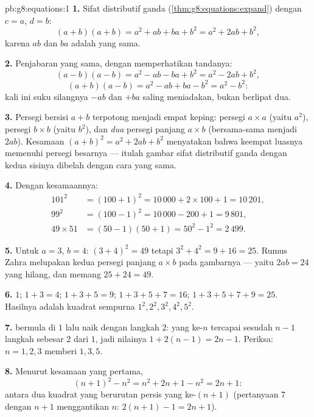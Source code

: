 \begin{solution}{pb:g8:equations:1}
\textbf{1.} Sifat distributif ganda
(\cref{thm:g8:equations:expand}) dengan $c = a$, $d = b$:
\[
(a + b)(a + b) = a^2 + ab + ba + b^2 = a^2 + 2ab + b^2 ,
\]
karena $ab$ dan $ba$ adalah  yang sama.

\textbf{2.} Penjabaran yang sama, dengan memperhatikan tandanya:
\[
(a - b)(a - b) = a^2 - ab - ba + b^2 = a^2 - 2ab + b^2 ,
\]
\[
(a + b)(a - b) = a^2 - ab + ba - b^2 = a^2 - b^2 :
\]
kali ini suku silangnya $-ab$ dan $+ba$ saling meniadakan, bukan
berlipat dua.

\textbf{3.} Persegi bersisi $a + b$ terpotong menjadi empat keping:
persegi $a \times a$ (yaitu $a^2$), persegi $b \times b$ (yaitu
$b^2$), dan \emph{dua} persegi panjang $a \times b$ (bersama-sama
menjadi $2ab$). Kesamaan $(a+b)^2 = a^2 + 2ab + b^2$ menyatakan bahwa
keempat luasnya memenuhi persegi besarnya --- itulah gambar sifat
distributif ganda dengan kedua sisinya dibelah dengan cara yang sama.

\textbf{4.} Dengan kesamaannya:
\begin{align*}
101^2 &= (100 + 1)^2 = 10\,000 + 2 \times 100 + 1 = 10\,201, \\
99^2 &= (100 - 1)^2 = 10\,000 - 200 + 1 = 9\,801, \\
49 \times 51 &= (50 - 1)(50 + 1) = 50^2 - 1^2 = 2\,499 .
\end{align*}

\textbf{5.} Untuk $a = 3$, $b = 4$: $(3 + 4)^2 = 49$ tetapi
$3^2 + 4^2 = 9 + 16 = 25$. Rumus Zahra melupakan kedua persegi
panjang $a \times b$ pada gambarnya --- yaitu $2ab = 24$ yang hilang,
dan memang $25 + 24 = 49$.

\textbf{6.} $1$; $1 + 3 = 4$; $1 + 3 + 5 = 9$;
$1 + 3 + 5 + 7 = 16$; $1 + 3 + 5 + 7 + 9 = 25$. Hasilnya adalah
kuadrat sempurna $1^2, 2^2, 3^2, 4^2, 5^2$.

\textbf{7.}  bermula di $1$ lalu naik dengan
langkah $2$: yang ke-$n$ tercapai sesudah $n - 1$ langkah sebesar $2$
dari $1$, jadi nilainya $1 + 2(n - 1) = 2n - 1$. Periksa:
$n = 1, 2, 3$ memberi $1, 3, 5$.

\textbf{8.} Menurut kesamaan yang pertama,
\[
(n + 1)^2 - n^2 = n^2 + 2n + 1 - n^2 = 2n + 1 :
\]
 antara dua kuadrat yang berurutan persis  yang
ke-$(n+1)$ (pertanyaan 7 dengan $n + 1$ menggantikan $n$:
$2(n+1) - 1 = 2n + 1$).


\end{solution}
